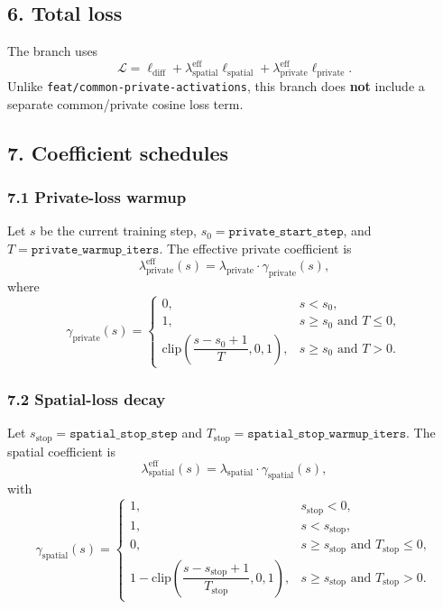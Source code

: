 \documentclass[11pt]{article}
\begin{document}
\subsection*{6. Total loss}
The branch uses
\[
  \mathcal{L}
  =
  \ell_{\mathrm{diff}}
  +
  \lambda_{\mathrm{spatial}}^{\mathrm{eff}} \ell_{\mathrm{spatial}}
  +
  \lambda_{\mathrm{private}}^{\mathrm{eff}} \ell_{\mathrm{private}}.
\]
Unlike \texttt{feat/common-private-activations}, this branch does \textbf{not} include a separate common/private cosine loss term.

\subsection*{7. Coefficient schedules}
\subsubsection*{7.1 Private-loss warmup}
Let $s$ be the current training step, $s_0=\texttt{private\_start\_step}$, and $T=\texttt{private\_warmup\_iters}$. The effective private coefficient is
\[
  \lambda_{\mathrm{private}}^{\mathrm{eff}}(s)
  =
  \lambda_{\mathrm{private}}\cdot \gamma_{\mathrm{private}}(s),
\]
where
\[
  \gamma_{\mathrm{private}}(s)
  =
  \begin{cases}
    0, & s < s_0,\\[4pt]
    1, & s\ge s_0 \text{ and } T\le 0,\\[4pt]
    \mathrm{clip}\!\left(\dfrac{s-s_0+1}{T},0,1\right), & s\ge s_0 \text{ and } T>0.
  \end{cases}
\]

\subsubsection*{7.2 Spatial-loss decay}
Let $s_{\mathrm{stop}}=\texttt{spatial\_stop\_step}$ and $T_{\mathrm{stop}}=\texttt{spatial\_stop\_warmup\_iters}$. The spatial coefficient is
\[
  \lambda_{\mathrm{spatial}}^{\mathrm{eff}}(s)
  =
  \lambda_{\mathrm{spatial}}\cdot \gamma_{\mathrm{spatial}}(s),
\]
with
\[
  \gamma_{\mathrm{spatial}}(s)
  =
  \begin{cases}
    1, & s_{\mathrm{stop}} < 0,\\[4pt]
    1, & s < s_{\mathrm{stop}},\\[4pt]
    0, & s\ge s_{\mathrm{stop}} \text{ and } T_{\mathrm{stop}}\le 0,\\[4pt]
    1-\mathrm{clip}\!\left(\dfrac{s-s_{\mathrm{stop}}+1}{T_{\mathrm{stop}}},0,1\right),
    & s\ge s_{\mathrm{stop}} \text{ and } T_{\mathrm{stop}}>0.
  \end{cases}
\]
\end{document}

